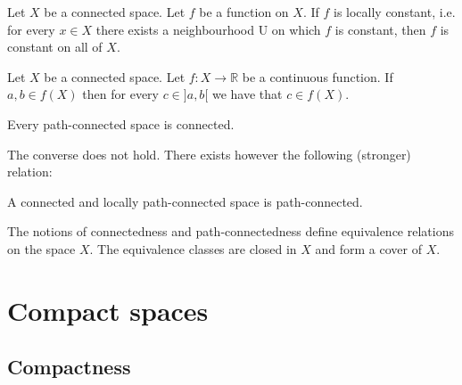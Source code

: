 	\begin{property}
		Let $X$ be a connected space. Let $f$ be a function on $X$. If $f$ is locally constant, i.e. for every $x\in X$ there exists a neighbourhood U on which $f$ is constant, then $f$ is constant on all of $X$.
	\end{property}
	
	\begin{theorem}\label{topology:theorem:intermediate_value_theorem}
		Let $X$ be a connected space. Let $f:X\rightarrow\mathbb{R}$ be a continuous function. If $a, b\in f(X)$ then for every $c\in ]a, b[$ we have that $c\in f(X)$.
	\end{theorem}

	
	\begin{property}
		Every path-connected space is connected.
	\end{property}
	The converse does not hold. There exists however the following (stronger) relation:
	\begin{property}
		A connected and locally path-connected space is path-connected.
	\end{property}
	
	\begin{remark}
		The notions of connectedness and path-connectedness define equivalence relations on the space $X$. The equivalence classes are closed in $X$ and form a cover of $X$.
	\end{remark}

\section{Compact spaces}
\subsection{Compactness}
	
    
